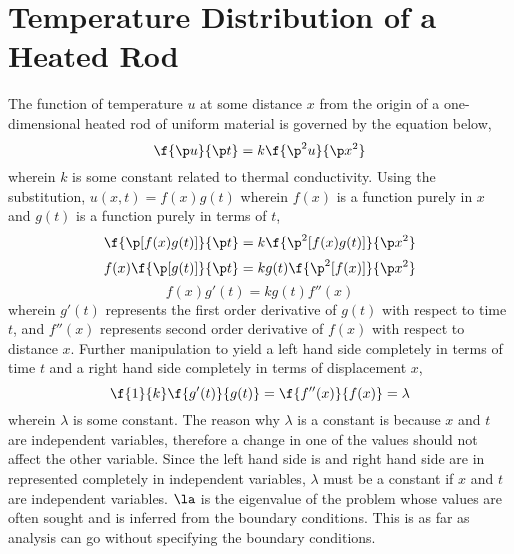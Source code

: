 \chapter{Temperature Distribution of a Heated Rod}
\begin{comment} 
Physics Archives
Havent inserted Sturm Liouville orthonormal basis functions
\end{comment}
The function of temperature $u$ at some distance $x$ from the origin of a one-dimensional heated rod of uniform material is governed by the equation below,
$$\f{\p u}{\p t} = k\f{\p^2 u}{\p x^2}$$                                                                  wherein $k$ is some constant related to thermal conductivity. Using the substitution, $u(x,t) = f(x)g(t)$ wherein $f(x)$ is a function purely in $x$ and $g(t)$ is a function purely in terms of $t$,
$$\f{\p [f(x)g(t)]}{\p t} = k\f{\p^2 [f(x)g(t)]}{\p x^2}$$
$$f(x)\f{\p [g(t)]}{\p t} = kg(t)\f{\p^2 [f(x)]}{\p x^2}$$
$$f(x)g'(t) = kg(t)f''(x)$$wherein $g'(t)$ represents the first order derivative of $g(t)$ with respect to time $t$, and $f''(x)$ represents second order derivative of $f(x)$ with respect to distance $x$. Further manipulation to yield a left hand side completely in terms of time $t$ and a right hand side completely in terms of displacement $x$,
$$\f{1}{k}\f{g'(t)}{g(t)} = \f{f''(x)}{f(x)} = \lambda$$wherein $\lambda$ is some constant. The reason why $\lambda$ is a constant is because $x$ and $t$ are independent variables, therefore a change in one of the values should not affect the other variable. Since the left hand side is and right hand side are in represented completely in independent variables, $\lambda$ must be a constant if $x$ and $t$ are independent variables. $\la$ is the eigenvalue of the problem whose values are often sought and is inferred from the boundary conditions. This is as far as analysis can go without specifying the boundary conditions.
